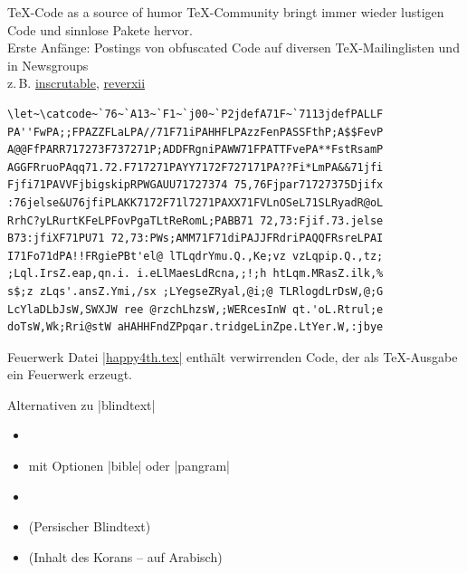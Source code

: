 \documentclass[
	vorläufig=false,
	datum=2022-12-22,
	titel={Witziges, Obskures und Sinnvolles…},
	web=false,
 	aspectratio=1610,
 	max,
]{../tex/latexkurs-slides}
\begin{document}
\begin{frame}{\textenglish{\TeX-Code as a source of humor}}
\TeX-Community bringt immer wieder lustigen Code und sinnlose Pakete hervor.\\Erste Anfänge: Postings von \textenglish{obfuscated Code} auf diversen \TeX-Mailinglisten und in Newsgroups\\ z.\,B. \href{http://www.ctan.org/pkg/inscrutable}{\alert{inscrutable}}, \href{http://www.ctan.org/pkg/reverxii}{\alert{reverxii}}
\end{frame}

\begin{frame}[fragile]
\thispagestyle{empty}
\begin{verbatim}
\let~\catcode~`76~`A13~`F1~`j00~`P2jdefA71F~`7113jdefPALLF
PA''FwPA;;FPAZZFLaLPA//71F71iPAHHFLPAzzFenPASSFthP;A$$FevP
A@@FfPARR717273F737271P;ADDFRgniPAWW71FPATTFvePA**FstRsamP
AGGFRruoPAqq71.72.F717271PAYY7172F727171PA??Fi*LmPA&&71jfi
Fjfi71PAVVFjbigskipRPWGAUU71727374 75,76Fjpar71727375Djifx
:76jelse&U76jfiPLAKK7172F71l7271PAXX71FVLnOSeL71SLRyadR@oL
RrhC?yLRurtKFeLPFovPgaTLtReRomL;PABB71 72,73:Fjif.73.jelse
B73:jfiXF71PU71 72,73:PWs;AMM71F71diPAJJFRdriPAQQFRsreLPAI
I71Fo71dPA!!FRgiePBt'el@ lTLqdrYmu.Q.,Ke;vz vzLqpip.Q.,tz;
;Lql.IrsZ.eap,qn.i. i.eLlMaesLdRcna,;!;h htLqm.MRasZ.ilk,%
s$;z zLqs'.ansZ.Ymi,/sx ;LYegseZRyal,@i;@ TLRlogdLrDsW,@;G
LcYlaDLbJsW,SWXJW ree @rzchLhzsW,;WERcesInW qt.'oL.Rtrul;e
doTsW,Wk;Rri@stW aHAHHFndZPpqar.tridgeLinZpe.LtYer.W,:jbye
\end{verbatim}
\end{frame}

\begin{frame}{Feuerwerk}
Datei \href{http://www.ctan.org/pkg/happy4th}{|happy4th.tex|} enthält verwirrenden Code, der als \TeX-Ausgabe ein Feuerwerk erzeugt.

\end{frame}

\begin{frame}[t,fragile]{Alternativen zu |blindtext|}
\begin{itemize}
\item {}
\item {} mit Optionen |bible| oder |pangram|
\item {}
\item {} (Persischer Blindtext)
\item {} (Inhalt des Korans – auf Arabisch)
\end{itemize}
\end{frame}
\end{document}
